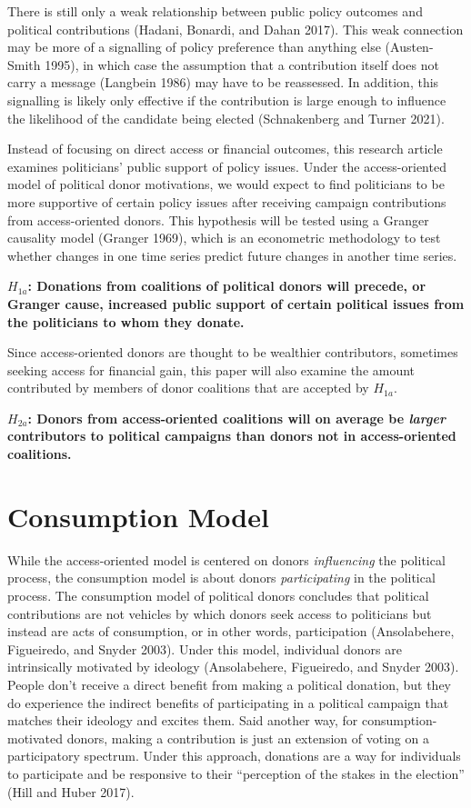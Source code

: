 \documentclass[12pt,]{article}
\begin{document}
There is still only a weak relationship between public policy outcomes
and political contributions (Hadani, Bonardi, and Dahan 2017). This weak
connection may be more of a signalling of policy preference than
anything else (Austen-Smith 1995), in which case the assumption that a
contribution itself does not carry a message (Langbein 1986) may have to
be reassessed. In addition, this signalling is likely only effective if
the contribution is large enough to influence the likelihood of the
candidate being elected (Schnakenberg and Turner 2021).

Instead of focusing on direct access or financial outcomes, this
research article examines politicians' public support of policy issues.
Under the access-oriented model of political donor motivations, we would
expect to find politicians to be more supportive of certain policy
issues after receiving campaign contributions from access-oriented
donors. This hypothesis will be tested using a Granger causality model
(Granger 1969), which is an econometric methodology to test whether
changes in one time series predict future changes in another time
series.

\textbf{\(H_{1a}\): Donations from coalitions of political donors will
precede, or Granger cause, increased public support of certain political
issues from the politicians to whom they donate.}

Since access-oriented donors are thought to be wealthier contributors,
sometimes seeking access for financial gain, this paper will also
examine the amount contributed by members of donor coalitions that are
accepted by \(H_{1a}\).

\textbf{\(H_{2a}\): Donors from access-oriented coalitions will on
average be \emph{larger} contributors to political campaigns than donors
not in access-oriented coalitions.}

\hypertarget{consumption-model}{%
\section{Consumption Model}\label{consumption-model}}

While the access-oriented model is centered on donors \emph{influencing}
the political process, the consumption model is about donors
\emph{participating} in the political process. The consumption model of
political donors concludes that political contributions are not vehicles
by which donors seek access to politicians but instead are acts of
consumption, or in other words, participation (Ansolabehere, Figueiredo,
and Snyder 2003). Under this model, individual donors are intrinsically
motivated by ideology (Ansolabehere, Figueiredo, and Snyder 2003).
People don't receive a direct benefit from making a political donation,
but they do experience the indirect benefits of participating in a
political campaign that matches their ideology and excites them. Said
another way, for consumption-motivated donors, making a contribution is
just an extension of voting on a participatory spectrum. Under this
approach, donations are a way for individuals to participate and be
responsive to their ``perception of the stakes in the election'' (Hill
and Huber 2017).
\end{document}
